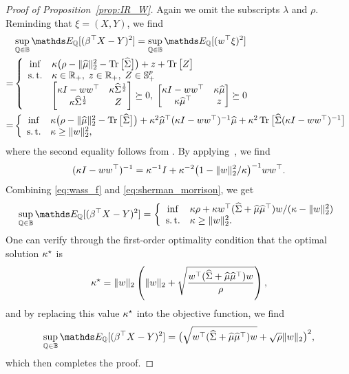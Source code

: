 \documentclass{article}
\begin{document}
\begin{proof}[Proof of Proposition~\ref{prop:IR_W}]
    Again we omit the subscripts $\lambda$ and $\rho$.
    Reminding that $\xi = (X, Y)$, we find
    \begin{equation}\label{eq:wass_f}
        \begin{split}
        &\Sup{\QQ \in \mbb B} \EE_\QQ[(\beta^\top X - Y)^2] = \Sup{\QQ \in \mbb B} \EE_\QQ[(w^\top \xi)^2] \\
        =& \left\{
	\begin{array}{cl}
	\inf & \dualvar \big(\rho - \|\msa\|_2^2 -  \Tr{\covsa} \big) + z + \Tr{Z} \\
	\st & \dualvar \in \R_+, \; z \in \R_+, \; Z \in \PSD^p \\
	& \begin{bmatrix} \dualvar I - ww^\top & \dualvar \covsa^\half \\ \dualvar \covsa^\half & Z \end{bmatrix} \succeq 0, \; \begin{bmatrix} \dualvar I - ww^\top & \dualvar \msa \\ \dualvar \msa^\top & z \end{bmatrix} \succeq 0
	\end{array}
	\right. \\
	=&\left\{
	    \begin{array}{cl}
	        \inf & \dualvar \big(\rho - \|\msa\|_2^2 -  \Tr{\covsa} \big) + \dualvar^2 \msa^\top (\dualvar I - ww^\top)^{-1} \msa + \dualvar^2 \Tr{\covsa (\dualvar I - ww^\top)^{-1}} \\
	        \st & \dualvar \ge \| w \|_2^2 ,
	    \end{array}
	\right.
    \end{split}
    \end{equation}
    where the second equality follows from \citet[Lemma 2]{ref:kuhn2019wasserstein}. By applying~\citet[Fact~2.16.3]{ref:bernstein2009matrix}, we find
	\begin{equation}\label{eq:sherman_morrison}
	     (\kappa I - ww^\top)^{-1} = \kappa^{-1} I + \kappa^{-2} \big( 1 - \|w\|_2^2/\kappa \big)^{-1}  w w^\top .
	\end{equation}
	Combining \eqref{eq:wass_f} and \eqref{eq:sherman_morrison}, we get
	\[
	    \Sup{\QQ \in \mbb B} \EE_\QQ[(\beta^\top X - Y)^2] =
	    \left\{
	        \begin{array}{cl}
	            \inf & \dualvar \rho + \dualvar  w^\top (\covsa + \msa \msa^\top) w / (\dualvar - \| w \|_2^2 )\\
	            \st & \dualvar \ge \| w\|_2^2.
	        \end{array}
	    \right.
	\]
	One can verify through the first-order optimality condition that the optimal solution $\kappa^\star$ is
	\[
	    \kappa^\star = \| w \|_2 \left( \| w \|_2 + \sqrt{\frac{w^\top (\widehat{\Sigma} + \widehat {\mu} \widehat {\mu}^\top) w }{\rho}} \right),
	\]
	and by replacing this value $\kappa^\star$ into the objective function, we find
	\[
	    \Sup{\QQ \in \mbb B} \EE_\QQ[(\beta^\top X - Y)^2] = \big( \sqrt{w^\top (\covsa + \msa\msa^\top) w} + \sqrt{\rho}\|w\|_2 \big)^2,
	\]
	which then completes the proof.
\end{proof}
\newpage
\end{document}
